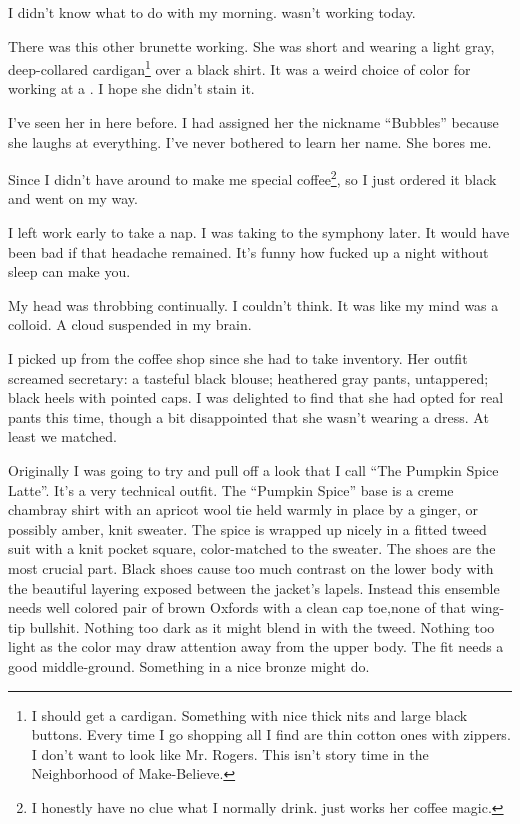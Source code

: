 \noindent
I didn't know what to do with my morning.  \april{} wasn't working today.


There was this other brunette working.
She was short and wearing a light gray, deep-collared cardigan\footnote{
  I should get a cardigan.
  Something with nice thick nits and large black buttons.
  Every time I go shopping all I find are thin cotton ones with zippers.
  I don't want to look like Mr. Rogers.
  This isn't story time in the Neighborhood of Make-Believe.
} over a black shirt.
It was a weird choice of color for working at a \cafe.
I hope she didn't stain it.


I've seen her in here before.
I had assigned her the nickname ``Bubbles'' because she laughs at everything.
I've never bothered to learn her name.  She bores me.


Since I didn't have \april{} around to make me special coffee\footnote{
I honestly have no clue what I normally drink.
\april{} just works her coffee magic.
}, so I just ordered it black and went on my way.
\VV


\noindent
I left work early to take a nap.
I was taking \april{} to the symphony later.
It would have been bad if that headache remained.
It's funny how fucked up a night without sleep can make you.


My head was throbbing continually.
I couldn't think.
It was like my mind was a colloid.
A cloud suspended in my brain.

\doublenewpage
\noindent
I picked up \april{} from the coffee shop since she had to take inventory.
Her outfit screamed secretary:  a tasteful black blouse;
heathered gray pants, untappered; black heels with pointed caps.
I was delighted to find that she had opted for real pants this time,
though a bit disappointed that she wasn't wearing a dress.
At least we matched.


Originally I was going to try and pull off a look that I call
``The Pumpkin Spice Latte''.
It's a very technical outfit.
The ``Pumpkin Spice'' base is a creme chambray shirt with an apricot wool tie
held warmly in place by a ginger, or possibly amber, knit sweater.
The spice is wrapped up nicely in a fitted tweed suit with a knit pocket
square, color-matched to the sweater.
The shoes are the most crucial part.
Black shoes cause too much contrast on the lower body with the beautiful
layering exposed between the jacket's lapels.
Instead this ensemble needs well colored pair of brown Oxfords with
a clean cap toe,none of that wing-tip bullshit.
Nothing too dark as it might blend in with the tweed.
Nothing too light as the color may draw attention away from
the upper body.
The fit needs a good middle-ground.
Something in a nice bronze might do.



